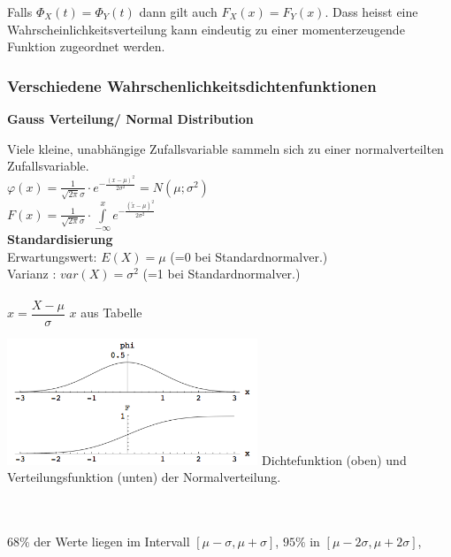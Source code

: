 		Falls $\Phi_X(t) = \Phi_Y(t)$ dann gilt auch $F_X(x)=F_Y(x)$. Dass heisst eine Wahrscheinlichkeitsverteilung kann eindeutig zu einer momenterzeugende Funktion zugeordnet werden.
		
		
			
	\subsubsection{Verschiedene Wahrschenlichkeitsdichtenfunktionen}
		\textbf{Gauss Verteilung/ Normal Distribution}\\
 		\begin{minipage}{10cm}
		Viele kleine, unabhängige Zufallsvariable sammeln sich zu einer
		normalverteilten Zufallsvariable.\\
		 $\varphi(x)=\frac{1}{\sqrt{2
		\pi}\sigma}\cdot e^{-\frac{(x-\mu)^2}{2\sigma^2}} = N(\mu ; \sigma^2) $\\ 
		$F(x)=\frac{1}{\sqrt{2
		\pi}\sigma}\cdot \int\limits^{x}_{-\infty}{e^{-\frac{(\tilde{x} -\mu)^2}{2\sigma^2}}} $ \\
		\textbf{Standardisierung}\\
		Erwartungswert: $E(X)=\mu$ \hspace{4mm}(=0 bei Standardnormalver.)\\ 
		Varianz \hspace{11.5mm}: $var(X)=\sigma^2$ (=1 bei Standardnormalver.)\\ \\
		$x=\dfrac{X-\mu}{\sigma}$ \hspace{5mm} $x$ aus Tabelle
		\end{minipage}
		\hspace{5mm}
		\begin{minipage}{7.5cm}
		\includegraphics[width=7.5cm]{bilder/normalverteilung.png}
		Dichtefunktion (oben) und Verteilungsfunktion (unten) der Normalverteilung. 
   		\end{minipage} \\ \\
		$ 68\% $ der Werte liegen im Intervall $[ \mu - \sigma, \mu + \sigma]$, 
		$95\% $ in $[ \mu - 2\sigma, \mu + 2\sigma]$, 	

